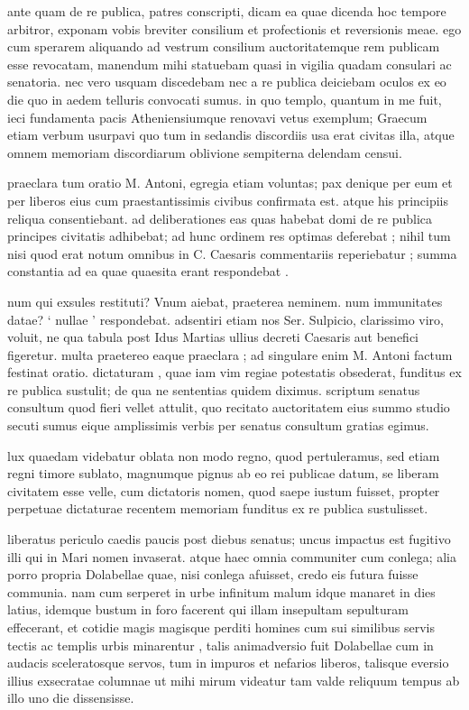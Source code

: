 
 ante quam de re publica, patres conscripti, dicam ea quae dicenda hoc tempore arbitror, exponam vobis breviter consilium et profectionis et reversionis meae. ego cum sperarem aliquando ad vestrum consilium auctoritatemque rem publicam esse revocatam, manendum mihi statuebam quasi in vigilia quadam consulari ac senatoria. nec vero usquam discedebam nec a re publica deiciebam oculos ex eo die quo in aedem telluris convocati sumus. in quo templo, quantum in me fuit, ieci fundamenta pacis Atheniensiumque renovavi vetus exemplum; Graecum etiam verbum usurpavi quo tum in sedandis discordiis usa erat civitas illa, atque omnem memoriam discordiarum oblivione sempiterna delendam censui.

 praeclara tum oratio M. Antoni, egregia etiam voluntas; pax denique per eum et per liberos eius cum praestantissimis civibus confirmata est. atque his principiis reliqua consentiebant. ad deliberationes eas quas habebat domi de re publica principes civitatis adhibebat; ad hunc ordinem res optimas deferebat ; nihil tum nisi quod erat notum omnibus in C. Caesaris commentariis reperiebatur ; summa constantia ad ea quae quaesita erant respondebat .

 num qui exsules restituti? Vnum aiebat, praeterea neminem. num immunitates datae? ` nullae ' respondebat. adsentiri etiam nos Ser. Sulpicio, clarissimo viro, voluit, ne qua tabula post Idus Martias ullius decreti Caesaris aut benefici figeretur. multa praetereo eaque praeclara ; ad singulare enim M. Antoni factum festinat oratio. dictaturam , quae iam vim regiae potestatis obsederat, funditus ex re publica sustulit; de qua ne sententias quidem diximus. scriptum senatus consultum quod fieri vellet attulit, quo recitato auctoritatem eius summo studio secuti sumus eique amplissimis verbis per senatus consultum gratias egimus.

 lux quaedam videbatur oblata non modo regno, quod pertuleramus, sed etiam regni timore sublato, magnumque pignus ab eo rei publicae datum, se liberam civitatem esse velle, cum dictatoris nomen, quod saepe iustum fuisset, propter perpetuae dictaturae recentem memoriam funditus ex re publica sustulisset.

 liberatus periculo caedis paucis post diebus senatus; uncus impactus est fugitivo illi qui in Mari nomen invaserat. atque haec omnia communiter cum conlega; alia porro propria Dolabellae quae, nisi conlega afuisset, credo eis futura fuisse communia. nam cum serperet in urbe infinitum malum idque manaret in dies latius, idemque bustum in foro facerent qui illam insepultam sepulturam effecerant, et cotidie magis magisque perditi homines cum sui similibus servis tectis ac templis urbis minarentur , talis animadversio fuit Dolabellae cum in audacis sceleratosque servos, tum in impuros et nefarios liberos, talisque eversio illius exsecratae columnae ut mihi mirum videatur tam valde reliquum tempus ab illo uno die dissensisse.

